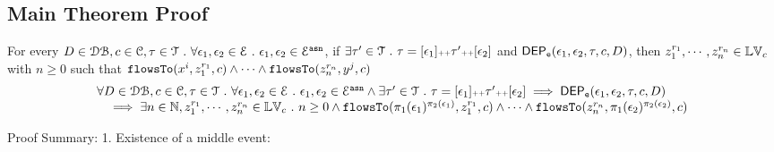 \subsection{Main Theorem Proof}
\begin{thm}
\label{thm:flowsto_event_soundness}
For every $D \in \mathcal{DB} , c \in \mathcal{C}, \mathtt{\tau} \in \mathcal{T} ~.~ \forall \mathtt{\epsilon}_1, \mathtt{\epsilon}_2 \in \mathcal{E} ~.~
\mathtt{\epsilon}_1, \mathtt{\epsilon}_2 \in \mathcal{E}^{\mathtt{{asn}}}$, 
if $\exists \mathtt{\tau}' \in \mathcal{T} ~.~ \mathtt{\tau} = [\mathtt{\epsilon}_1] {\scriptscriptstyle ++} \mathtt{\tau}' {\scriptscriptstyle ++} [\mathtt{\epsilon}_2]$ and 
$\mathsf{DEP_{\mathtt{e}}}(\mathtt{\epsilon}_1, \mathtt{\epsilon}_2, \mathtt{\tau}, c, D) $, then
 $z_1^{r_1}, \cdots, z_n^{r_n} \in \mathbb{LV}_{{c}}$ with $n \geq 0$ such that   
$\mathtt{flowsTo}(x^i,  z_1^{r_1}, c) 
\land \cdots \land \mathtt{flowsTo}(z_n^{r_n}, y^j, c)$
%
\[
  \begin{array}{l}
		\forall D \in \mathcal{DB} , c \in \mathcal{C}, \mathtt{\tau} \in \mathcal{T} ~.~ \forall \mathtt{\epsilon}_1, \mathtt{\epsilon}_2 \in \mathcal{E} ~.~
    \mathtt{\epsilon}_1, \mathtt{\epsilon}_2 \in \mathcal{E}^{\mathtt{{asn}}} \land 
		 \exists \mathtt{\tau}' \in \mathcal{T} ~.~ \mathtt{\tau} = [\mathtt{\epsilon}_1] {\scriptscriptstyle ++} \mathtt{\tau}' {\scriptscriptstyle ++} [\mathtt{\epsilon}_2]
		\implies
		\mathsf{DEP_{\mathtt{e}}}(\mathtt{\epsilon}_1, \mathtt{\epsilon}_2, \mathtt{\tau}, c, D) 
		\\ \quad 
		\implies 
    \exists n \in \mathbb{N}, z_1^{r_1}, \cdots, z_n^{r_n} \in \mathbb{LV}_{{c}} ~.~ n \geq 0 \land
		\mathtt{flowsTo}(\pi_1(\mathtt{\epsilon}_1)^{\pi_2(\mathtt{\epsilon}_1)},  z_1^{r_1}, c) 
    \land \cdots \land \mathtt{flowsTo}(z_n^{r_n}, \pi_1(\mathtt{\epsilon}_2)^{\pi_2(\mathtt{\epsilon}_2)}, c) 
	\end{array}
\]
\end{thm}
Proof Summary:
1. Existence of a middle event:

